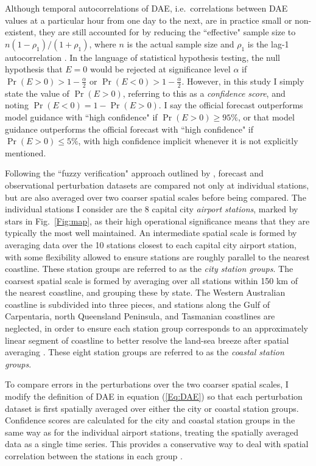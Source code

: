 \documentclass[twocol]{ametsoc}
\DeclareMathOperator{\pr}{Pr}
\begin{document}
Although temporal autocorrelations of DAE, i.e.~correlations between DAE values at a particular hour from one day to the next, are in practice small or non-existent, they are still accounted for by reducing the ``effective" sample size to $ n \left(1-\rho_1\right)/\left(1+\rho_1\right)$, where $n$ is the actual sample size and $\rho_1$ is the lag-1 autocorrelation \citep{zwiers95,wilks11}. In the language of statistical hypothesis testing, the null hypothesis that $E=0$ would be rejected at significance level $\alpha$ if $\pr(E>0) > 1-\frac{\alpha}{2}$ or $\pr(E<0) > 1-\frac{\alpha}{2}$. However, in this study I simply state the value of $\pr(E>0)$, referring to this as a \textit{confidence score}, and noting $\pr(E<0) = 1- \pr(E>0)$. I say the official forecast outperforms model guidance with ``high confidence" if $\pr(E>0) \geq 95\%$, or that model guidance outperforms the  official forecast with ``high confidence" if $\pr(E>0) \leq 5\%$, with high confidence implicit whenever it is not explicitly mentioned.

Following the ``fuzzy verification" approach outlined by \citet{ebert08}, forecast and observational perturbation datasets are compared not only at individual stations, but are also averaged over two coarser spatial scales before being compared. The individual stations I consider are the 8 capital city \textit{airport stations}, marked by stars in Fig.~\ref{Fig:map}, as their high operational significance means that they are typically the most well maintained. An intermediate spatial scale is formed by averaging data over the 10 stations closest to each capital city airport station, with some flexibility allowed to ensure stations are roughly parallel to the nearest coastline. These station groups are referred to as the \textit{city station groups}. The coarsest spatial scale is formed by averaging over all stations within 150 km of the nearest coastline, and grouping these by state. The Western Australian coastline is subdivided into three pieces, and stations along the Gulf of Carpentaria, north Queensland Peninsula, and Tasmanian coastlines are neglected, in order to ensure each station group corresponds to an approximately linear segment of coastline to better resolve the land-sea breeze after spatial averaging \citep[e.g.][]{vincent16}. These eight station groups are referred to as the \textit{coastal station groups}.

To compare errors in the perturbations over the two coarser spatial scales, I modify the definition of DAE in equation (\ref{Eq:DAE}) so that each perturbation dataset is first spatially averaged over either the city or coastal station groups. Confidence scores are calculated for the city and coastal station groups in the same way as for the individual airport stations, treating the spatially averaged data as a single time series. This provides a conservative way to deal with spatial correlation between the stations in each group \citep{griffiths17}. 
\end{document}
